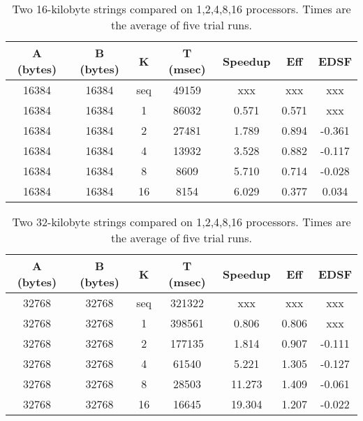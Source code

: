 \begin{table}[h]
	\begin{center}
		\begin{tabular}{ | c | c | c | c | c | c | c |}
			\hline 
			A (bytes)&	B (bytes) &	K	&	T (msec)	&	Speedup	&	Eff	&	EDSF \\
			\hline		
			16384   &	16384   &	seq	&	49159		&	xxx		&	xxx	&	xxx \\
			16384  	&	16384  	&	1	&	86032		&	0.571&0.571		&	xxx \\
			16384  	&	16384  	&	2	&	27481	 	&	1.789&0.894		&-0.361\\
			16384  	&	16384  	&	4	&	13932	 	&	3.528&0.882		&-0.117\\
			16384  	&	16384  	&	8	&	8609	 	&	5.710&0.714		&-0.028\\
			16384  	&	16384  	&	16	&	8154	 	&	6.029&0.377		&0.034\\
			\hline
		\end{tabular}
	\end{center}
	\caption{Two 16-kilobyte strings compared on {1,2,4,8,16} processors. Times are the average of five trial runs.}
\end{table}

\begin{table}[h]
	\begin{center}
		\begin{tabular}{ | c | c | c | c | c | c | c |}
			\hline 
			A (bytes)&	B (bytes) &	K	&	T (msec)	&	Speedup	&	Eff		&	EDSF \\
			\hline		
			32768   &	32768   &	seq	&	321322		&	xxx		&	xxx		&	xxx \\
			32768  	&	32768  	&	1	&	398561		&	0.806 	&	0.806	&	xxx \\
			32768  	&	32768  	&	2	&	177135	 	&	1.814 	&	0.907	&	-0.111\\
			32768  	&	32768  	&	4	&	61540	 	&	5.221 	&	1.305	&	-0.127\\
			32768  	&	32768  	&	8	&	28503	 	&	11.273	&	1.409	&	-0.061\\
			32768  	&	32768  	&	16	&	16645	 	&	19.304	&	1.207	&	-0.022\\
			\hline
		\end{tabular}
	\end{center}
	\caption{Two 32-kilobyte strings compared on {1,2,4,8,16} processors. Times are the average of five trial runs.}
\end{table}

